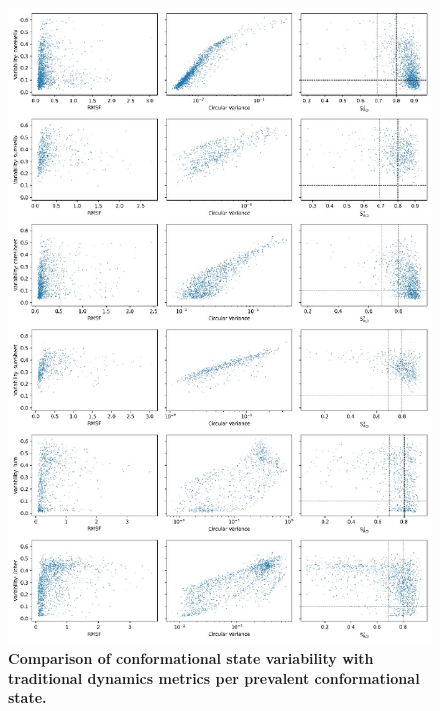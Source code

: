 \begin{figure}[H]
    \centering
    \includegraphics[width=0.85\linewidth]{constava//sup_figs/supfig10.pdf}
    \caption{\textbf{Comparison of conformational state variability with traditional dynamics metrics per prevalent conformational state.} 
    }
    \label{fig:sup_fig_constava:metrics}
\end{figure}

